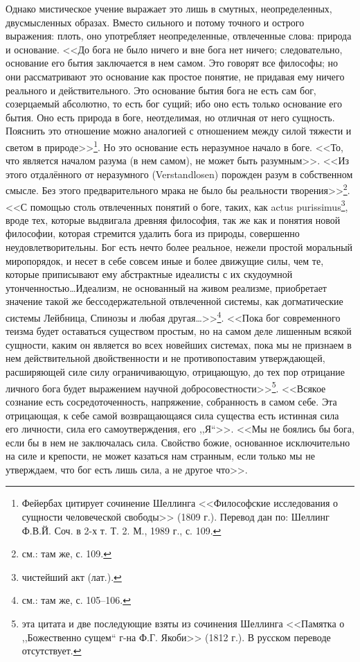 \documentclass[12pt,oneside]{book}
\begin{document}
Однако мистическое учение выражает это лишь в смутных, неопределенных, двусмысленных образах. Вместо сильного и потому точного и острого выражения: плоть, оно употребляет неопределенные, отвлеченные слова: природа и основание. <<До бога не было ничего и вне бога нет ничего; следовательно, основание его бытия заключается в нем самом. Это говорят все философы; но они рассматривают это основание как простое понятие, не придавая ему ничего реального и действительного. Это основание бытия бога не есть сам бог, созерцаемый абсолютно, то есть бог сущий; ибо оно есть только основание его бытия. Оно есть природа в боге, неотделимая, но отличная от него сущность. Пояснить это отношение можно аналогией с отношением между силой тяжести и светом в природе>>\footnote{Фейербах цитирует сочинение Шеллинга <<Философские исследования о сущности человеческой свободы>> (1809 г.). Перевод дан по: Шеллинг Ф.В.Й. Соч. в 2-х т. Т. 2. М., 1989 г., с. 109.}. Но это основание есть неразумное начало в боге. <<То, что является началом разума (в нем самом), не может быть разумным>>. <<Из этого отдалённого от неразумного (Verstandlosen) порожден разум в собственном смысле. Без этого предварительного мрака не было бы реальности творения>>\footnote{см.: там же, с. 109.}. <<С помощью столь отвлеченных понятий о боге, таких, как actus purissimus\footnote{чистейший акт (лат.).}, вроде тех, которые выдвигала древняя философия, так же как и понятия новой философии, которая стремится удалить бога из природы, совершенно неудовлетворительны. Бог есть нечто более реальное, нежели простой моральный миропорядок, и несет в себе совсем иные и более движущие силы, чем те, которые приписывают ему абстрактные идеалисты с их скудоумной утонченностью\dots Идеализм, не основанный на живом реализме, приобретает значение такой же бессодержательной отвлеченной системы, как догматические системы Лейбница, Спинозы и любая другая\dots>>\footnote{см.: там же, с. 105--106.}. <<Пока бог современного теизма будет оставаться существом простым, но на самом деле лишенным всякой сущности, каким он является во всех новейших системах, пока мы не признаем в нем действительной двойственности и не противопоставим утверждающей, расширяющей силе силу ограничивающую, отрицающую, до тех пор отрицание личного бога будет выражением научной добросовестности>>\footnote{эта цитата и две последующие взяты из сочинения Шеллинга <<Памятка о ,,Божественно сущем`` г-на Ф.Г. Якоби>> (1812 г.). В русском переводе отсутствует.}. <<Всякое сознание есть сосредоточенность, напряжение, собранность в самом себе. Эта отрицающая, к себе самой возвращающаяся сила существа есть истинная сила его личности, сила его самоутверждения, его ,,Я``>>. <<Мы не боялись бы бога, если бы в нем не заключалась сила. Свойство божие, основанное исключительно на силе и крепости, не может казаться нам странным, если только мы не утверждаем, что бог есть лишь сила, а не другое что>>.
\end{document}
